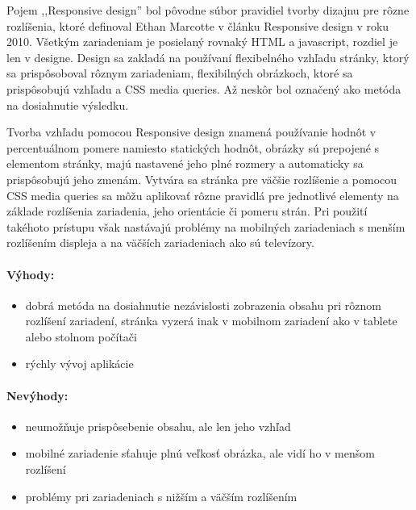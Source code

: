 Pojem ,,Responsive design'' bol pôvodne súbor pravidiel tvorby dizajnu pre rôzne rozlíšenia, ktoré definoval Ethan Marcotte v článku Responsive design v roku 2010. Všetkým zariadeniam je posielaný rovnaký HTML a javascript, rozdiel je len v designe. Design sa zakladá na používaní flexibelného vzhľadu stránky, ktorý sa prispôsoboval rôznym zariadeniam, flexibilných obrázkoch, ktoré sa prispôsobujú vzhľadu a CSS media queries. \cite{responsive, mediaqueries} Až neskôr bol označený ako metóda na dosiahnutie výsledku.

Tvorba vzhľadu pomocou Responsive design znamená používanie hodnôt v percentuálnom pomere namiesto statických hodnôt, obrázky sú prepojené s elementom stránky, majú nastavené jeho plné rozmery a automaticky sa prispôsobujú jeho zmenám. Vytvára sa stránka pre väčšie rozlíšenie a pomocou CSS media queries sa môžu aplikovať rôzne pravidlá pre jednotlivé elementy na základe rozlíšenia zariadenia, jeho orientácie či pomeru strán. Pri použití takéhoto prístupu však nastávajú problémy na mobilných zariadeniach s menším rozlíšením displeja a na väčších zariadeniach ako sú televízory.\\



\paragraph{Výhody:}
\begin{itemize}
	\item dobrá metóda na dosiahnutie nezávislosti zobrazenia obsahu pri rôznom rozlíšení zariadení, stránka vyzerá inak v mobilnom zariadení ako v tablete alebo stolnom počítači
	\item rýchly vývoj aplikácie
\end{itemize}

\paragraph{Nevýhody:}
\begin{itemize}
	\item neumožňuje prispôsebenie obsahu, ale len jeho vzhľad
	\item mobilné zariadenie sťahuje plnú veľkosť obrázka, ale vidí ho v menšom rozlíšení
	\item problémy pri zariadeniach s nižším a väčším rozlíšením
\end{itemize}

